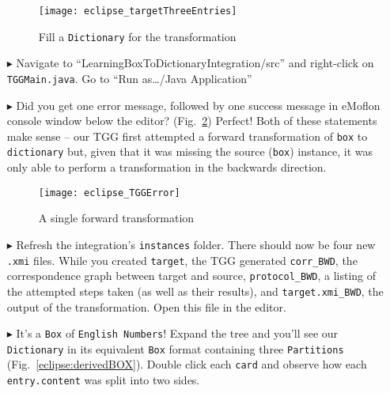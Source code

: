 \begin{itemize}
\vspace{0.5cm}

\begin{figure}[htbp]
\begin{center}
  \texttt{[image: eclipse\_targetThreeEntries]}
  \caption{Fill a \texttt{Dictionary} for the transformation}
  \label{eclipse:dictionaryxmi}
\end{center}
\end{figure}

\item[$\blacktriangleright$] Navigate to ``LearningBox\-To\-Dictionary\-In\-te\-gra\-tion\-/src'' and right-click on \texttt{TGGMain.java}. Go to ``Run
as\ldots/Java Application''

\vspace{0.5cm}

\item[$\blacktriangleright$] Did you get one error message, followed by one success message in eMoflon console window below the editor?
(Fig.~\ref{eclipse:tggERROR}) Perfect! Both of these statements make sense -- our TGG first attempted a forward transformation of \texttt{box} to
\texttt{dictionary} but, given that it was missing the source (\texttt{box}) instance, it was only able to perform a transformation in the backwards direction.

\begin{figure}[htbp]
\begin{center}
  \texttt{[image: eclipse\_TGGError]}
  \caption{A single forward transformation}
  \label{eclipse:tggERROR}
\end{center}
\end{figure}

\newpage

\item[$\blacktriangleright$] Refresh the integration's \texttt{instances} folder. There should now be four new \texttt{.xmi} files. While you created
\texttt{target}, the TGG generated \texttt{corr\_BWD}, the correspondence graph between target and source, \texttt{protocol\_BWD}, a listing of the attempted
steps taken (as well as their results), and \texttt{target.xmi\_BWD}, the output of the transformation. Open this file in the editor.

\item[$\blacktriangleright$] It's a \texttt{Box} of \texttt{English Numbers}! Expand the tree and you'll see our \texttt{Dictionary} in its equivalent
\texttt{Box} format containing three \texttt{Par\-ti\-tions} (Fig.~\ref{eclipse:derivedBOX}). Double click each \texttt{card} and observe how each
\texttt{entry.content} was split into two sides.


\end{itemize}
